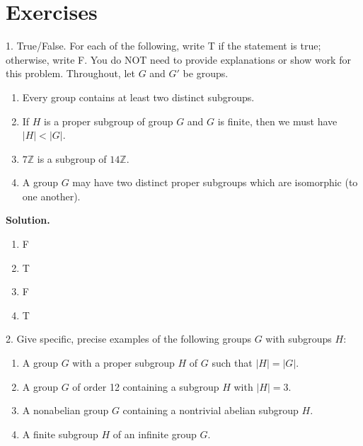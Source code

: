 \documentclass[10pt,]{book}
\theoremstyle{plain}
\theoremstyle{definition}
\theoremstyle{definition}
\theoremstyle{definition}
\theoremstyle{definition}
\numberwithin{equation}{section}
\def\Z{\mathbb{Z}}
\newcommand{\lt}{ < }
\begin{document}
\section[{Exercises}]{Exercises}\label{exercises-5}
\begin{exerciselist}
\item[1.]\hypertarget{exercise-28}{}
        True/False. For each of the following, write T if the statement is
        true; otherwise, write F. You do NOT need to provide explanations or show work for this problem. Throughout, let \(G\) and \(G'\) be groups.
        \leavevmode%
\begin{enumerate}[label=(\alph*)]
\item\hypertarget{li-209}{}
              Every group contains at least two distinct subgroups.
\item\hypertarget{li-210}{}
              If \(H\) is a proper subgroup of group \(G\) and \(G\) is finite, then we must have \(|H|\lt |G|\).
\item\hypertarget{li-211}{}
              \(7\Z\) is a subgroup of \(14\Z\).
\item\hypertarget{li-212}{}
              A group \(G\) may have two distinct proper subgroups which are isomorphic (to one another).
\end{enumerate}

\par\smallskip
\par\smallskip
\noindent\textbf{Solution.}\hypertarget{solution-28}{}\quad
\leavevmode%
\begin{multicols}{4}
\begin{enumerate}[label=(\alph*)]
\item\hypertarget{li-213}{}
          F
\item\hypertarget{li-214}{}
          T
\item\hypertarget{li-215}{}
          F
\item\hypertarget{li-216}{}
          T
\end{enumerate}
\end{multicols}
\item[2.]\hypertarget{exercise-29}{}
        Give specific, precise examples of the following groups \(G\) with subgroups \(H\):
        \leavevmode%
\begin{enumerate}[label=(\alph*)]
\item\hypertarget{li-217}{}
              A group \(G\) with a proper subgroup \(H\) of \(G\) such that \(|H|=|G|\).
\item\hypertarget{li-218}{}
              A group \(G\) of order 12 containing a subgroup \(H\) with \(|H|=3\).
\item\hypertarget{li-219}{}
              A nonabelian group \(G\) containing a nontrivial abelian subgroup \(H\).
\item\hypertarget{li-220}{}
              A finite subgroup \(H\) of an infinite group \(G\).
\end{enumerate}


\end{exerciselist}
\end{document}
